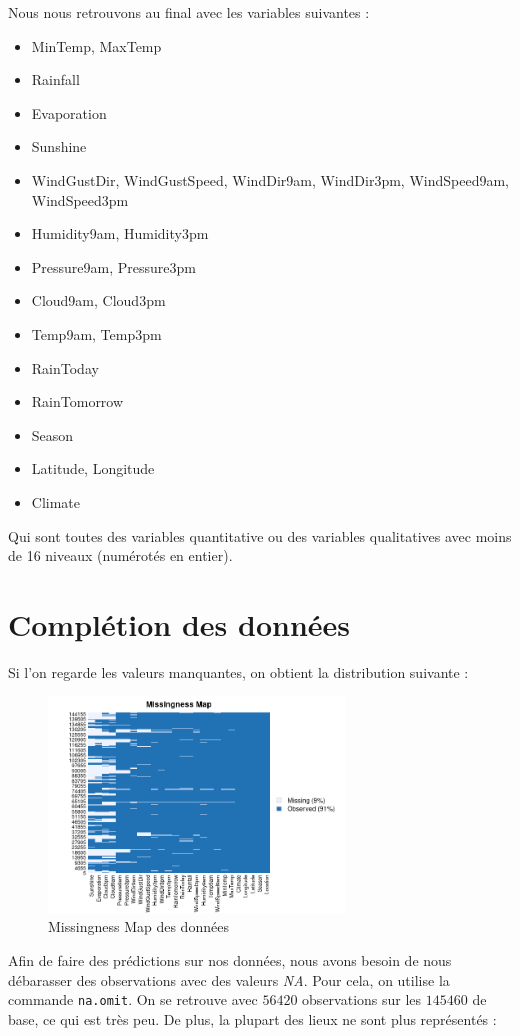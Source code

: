 \documentclass{article}
\begin{document}
Nous nous retrouvons au final avec les variables suivantes : 
\begin{itemize}
    \item MinTemp, MaxTemp
    \item Rainfall
    \item Evaporation
    \item Sunshine
    \item WindGustDir, WindGustSpeed, WindDir9am, WindDir3pm, WindSpeed9am, WindSpeed3pm
    \item Humidity9am, Humidity3pm
    \item Pressure9am, Pressure3pm
    \item Cloud9am, Cloud3pm
    \item Temp9am, Temp3pm
    \item RainToday
    \item RainTomorrow
    \item Season
    \item Latitude, Longitude
    \item Climate
\end{itemize}
Qui sont toutes des variables quantitative ou des variables qualitatives avec moins de 16 niveaux (numérotés en entier).

\section{Complétion des données}

Si l'on regarde les valeurs manquantes, on obtient la distribution suivante : 

\begin{figure}[H]
    \centering
    \includegraphics[width=0.7\textwidth]{Images/missmap.png}
    \caption{Missingness Map des données}
\end{figure}

Afin de faire des prédictions sur nos données, nous avons besoin de nous débarasser des observations avec des valeurs \emph{NA}. Pour cela, on utilise la commande \texttt{na.omit}. On se retrouve avec $56420$ observations sur les $145460$ de base, ce qui est très peu. De plus, la plupart des lieux ne sont plus représentés :
\end{document}
